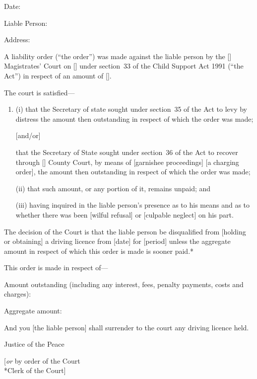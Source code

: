 \documentclass[12pt,a4paper]{article}
\begin{document}
\medskip

Date:

\medskip

Liable Person:

\medskip

Address:

\medskip

A liability order (``the order'') was made against the liable person by the [\phantom{Bolton}] Magistrates' Court on [\phantom{\today}] under section~33 of the Child Support Act 1991 (``the Act'') in respect of an amount of [\phantom{£100.00}].

The court is satisfied---
\begin{enumerate}
\item[]
(i) that the Secretary of state sought under section~35 of the Act to levy by distress the amount then outstanding in respect of which the order was made;

[and/or]

that the Secretary of State sought under section~36 of the Act to recover through [\phantom{Bolton}] County Court, by means of [garnishee proceedings] [a charging order], the amount then outstanding in respect of which the order was made;

(ii) that such amount, or any portion of it, remains unpaid; and

(iii) having inquired in the liable person's presence as to his means and as to whether there was been [wilful refusal] or [culpable neglect] on his part.
\end{enumerate}

The decision of the Court is that the liable person be disqualified from [holding or obtaining] a driving licence from [date] for [period] unless the aggregate amount in respect of which this order is made is sooner paid.*

\medskip

This order is made in respect of---

Amount outstanding (including any interest, fees, penalty payments, costs and charges):

\medskip

Aggregate amount:

\medskip

And you [the liable person] shall surrender to the court any driving licence %
held.

\medskip

{\raggedleft Justice of the Peace

\medskip

[\emph{or} by order of the Court\\*Clerk of the Court]

}
\end{document}
